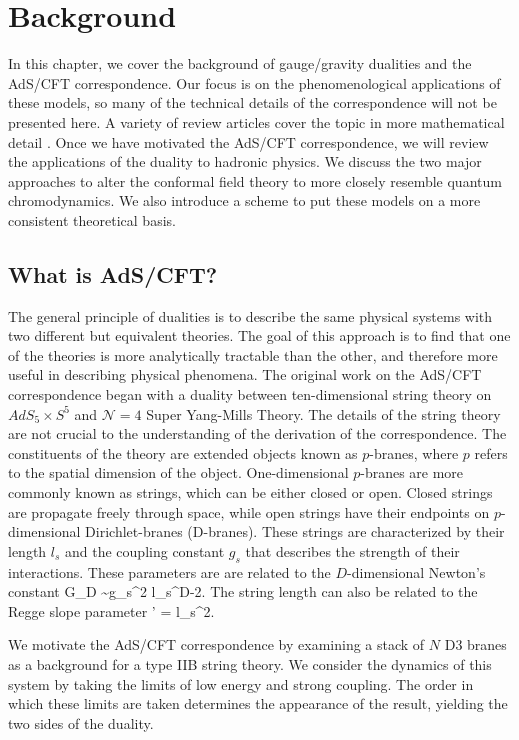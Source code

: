 \chapter{Background}
\label{background}

In this chapter, we cover the background of gauge/gravity dualities and the AdS/CFT correspondence.
Our focus is on the phenomenological applications of these models, so many of the technical details of the correspondence will not be presented here.
A variety of review articles cover the topic in more mathematical detail \cite{FILL-IN}.
Once we have motivated the AdS/CFT correspondence, we will review the applications of the duality to hadronic physics. 
We discuss the two major approaches to alter the conformal field theory to more closely resemble quantum chromodynamics.
We also introduce a scheme to put these models on a more consistent theoretical basis.

\section{What is AdS/CFT?}
The general principle of dualities is to describe the same physical systems with two different but equivalent theories. 
The goal of this approach is to find that one of the theories is more analytically tractable than the other, and therefore more useful in describing physical phenomena.
The original work on the AdS/CFT correspondence began with a duality between ten-dimensional string theory on $AdS_5 \times S^5$ and $\mathcal{N}=4 $ Super Yang-Mills Theory.
The details of the string theory are not crucial to the understanding of the derivation of the correspondence.
The constituents of the theory are extended objects known as $p$-branes, where $p$ refers to the spatial dimension of the object. 
One-dimensional $p$-branes are more commonly known as strings, which can be either closed or open.
Closed strings are propagate freely through space, while open strings have  their endpoints on $p$-dimensional Dirichlet-branes (D-branes). 
These strings are characterized by their length $l_s$ and the coupling constant $g_s$ that describes the strength of their interactions. 
These parameters are are related to the $D$-dimensional Newton's constant
\be
G_D \sim g_s^2 l_s^{D-2}.
\ee
The string length can also be related to the Regge slope parameter
\be
\alpha' = l_s^2.
\label{eq:ReggeSlope}
\ee

We motivate the AdS/CFT correspondence by examining a stack of $N$ D3 branes as a background for a type IIB string theory.
We consider the dynamics of this system by taking the limits of low energy and strong coupling. 
The order in which these limits are taken determines the appearance of the result, yielding the two sides of the duality.

